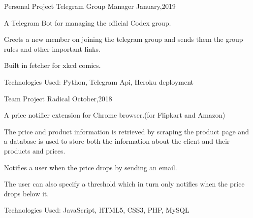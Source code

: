 

\begin{cventries}

 \cventry
    {Personal Project} %
    {Telegram Group Manager} %
    {} %
    {January,2019} %
    {
      \begin{cvitems} %
        \item {A Telegram Bot for managing the official Codex group.}
        \item {Greets a new member on joining the telegram group and sends them the group rules and other important links.}
        \item {Built in fetcher for xkcd comics.}
        \item {Technologies Used: Python, Telegram Api, Heroku deployment}
      \end{cvitems}
    }


  \cventry
    {Team Project} %
    {Radical} %
    {} %
    {October,2018} %
    {
      \begin{cvitems} %
        \item {A price notifier extension for Chrome browser.(for Flipkart and Amazon)}
        \item {The price and product information is retrieved by scraping the product page and a database is used to store both the information about the client and their products and prices.}
        \item {Notifies a user when the price drops by sending an email.}
        \item The user can also specify a threshold which in turn only notifies when the price drops below it.
        \item {Technologies Used: JavaScript, HTML5, CSS3, PHP, MySQL}
      \end{cvitems}
    }


\end{cventries}
